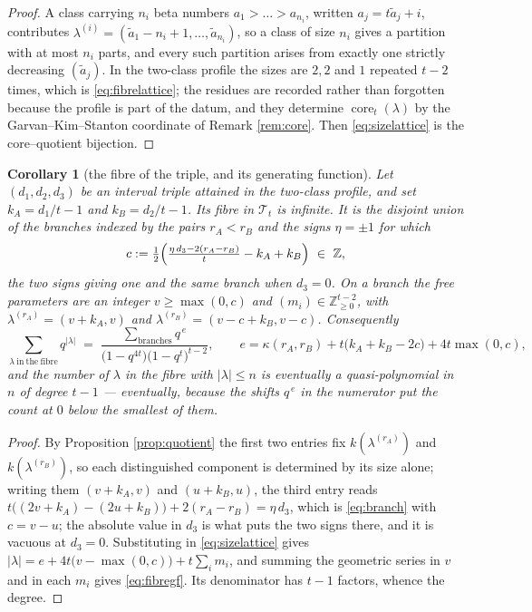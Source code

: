 \documentclass[11pt,reqno]{amsart}
\theoremstyle{plain}
\newtheorem{corollary}[theorem]{Corollary}
\theoremstyle{definition}
\newcommand{\ZZ}{\mathbb{Z}}
\newcommand{\core}{\operatorname{core}}
\begin{document}
\begin{proof}
A class carrying $n_i$ beta numbers $a_1>\dots>a_{n_i}$, written $a_j=t\tilde a_j+i$, contributes
$\lambda^{(i)}=(\tilde a_1-n_i+1,\dots,\tilde a_{n_i})$, so a class of size $n_i$ gives a partition
with at most $n_i$ parts, and every such partition arises from exactly one strictly decreasing
$(\tilde a_j)$. In the two-class profile the sizes are $2,2$ and $1$ repeated $t-2$ times, which is
\eqref{eq:fibrelattice}; the residues are recorded rather than forgotten because the profile is part
of the datum, and they determine $\core_t(\lambda)$ by the Garvan--Kim--Stanton coordinate of
Remark \ref{rem:core}. Then \eqref{eq:sizelattice} is the core--quotient bijection.
\end{proof}

\begin{corollary}[the fibre of the triple, and its generating function]\label{cor:fibregf}
Let $(d_1,d_2,d_3)$ be an interval triple attained in the two-class profile, and set
$k_A=d_1/t-1$ and $k_B=d_2/t-1$. Its fibre in $\mathcal{T}_t$ is infinite. It is the disjoint union
of the branches indexed by the pairs $r_A<r_B$ and the signs $\eta=\pm1$ for which
\begin{equation}\label{eq:branch}
c:=\tfrac12\Bigl(\tfrac{\eta\,d_3-2(r_A-r_B)}{t}-k_A+k_B\Bigr)\ \in\ \ZZ ,
\end{equation}
the two signs giving one and the same branch when $d_3=0$. On a branch the free parameters are an
integer $v\ge\max(0,c)$ and $(m_i)\in\ZZ_{\ge0}^{t-2}$, with $\lambda^{(r_A)}=(v+k_A,v)$ and
$\lambda^{(r_B)}=(v-c+k_B,v-c)$. Consequently
\begin{equation}\label{eq:fibregf}
\sum_{\lambda\ \mathrm{in\ the\ fibre}}\!\!q^{|\lambda|}
\;=\;\frac{\sum_{\mathrm{branches}}q^{\,e}}{\bigl(1-q^{4t}\bigr)\bigl(1-q^{t}\bigr)^{t-2}},
\qquad e=\kappa(r_A,r_B)+t\bigl(k_A+k_B-2c\bigr)+4t\max(0,c),
\end{equation}
and the number of $\lambda$ in the fibre with $|\lambda|\le n$ is eventually a quasi-polynomial in
$n$ of degree $t-1$ --- eventually, because the shifts $q^{\,e}$ in the numerator put the count at
$0$ below the smallest of them.
\end{corollary}

\begin{proof}
By Proposition \ref{prop:quotient} the first two entries fix $k(\lambda^{(r_A)})$ and
$k(\lambda^{(r_B)})$, so each distinguished component is determined by its size alone; writing them
$(v+k_A,v)$ and $(u+k_B,u)$, the third entry reads
$t\bigl((2v+k_A)-(2u+k_B)\bigr)+2(r_A-r_B)=\eta\,d_3$, which is \eqref{eq:branch} with $c=v-u$; the
absolute value in $d_3$ is what puts the two signs there, and it is vacuous at $d_3=0$.
Substituting in \eqref{eq:sizelattice} gives $|\lambda|=e+4t\bigl(v-\max(0,c)\bigr)+t\sum_i m_i$, and
summing the geometric series in $v$ and in each $m_i$ gives \eqref{eq:fibregf}. Its denominator has
$t-1$ factors, whence the degree.
\end{proof}
\end{document}
